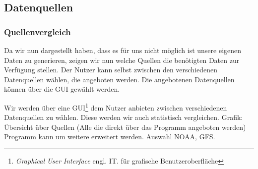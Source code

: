 \documentclass[a4paper,oneside,12pt,titlepage]{article}
\begin{document}
\subsection{Datenquellen} %

\subsubsection{Quellenvergleich} %
Da wir nun dargestellt haben, dass es für uns nicht möglich ist unsere eigenen Daten zu generieren, zeigen wir nun welche Quellen die benötigten Daten zur Verfügung stellen. Der Nutzer kann selbst zwischen den verschiedenen Datenquellen wählen, die angeboten werden. Die angebotenen Datenquellen können über die GUI gewählt werden.

Wir werden über eine GUI\footnote{\textit{Graphical User Interface} engl. IT. für grafische Benutzeroberfläche} dem Nutzer anbieten zwischen verschiedenen Datenquellen zu wählen. Diese werden wir auch statistisch vergleichen.
Grafik: Übersicht über Quellen (Alle die direkt über das Programm angeboten werden)
Programm kann um weitere erweitert werden.
Auswahl NOAA, GFS.\cite{noaa}
\end{document}
